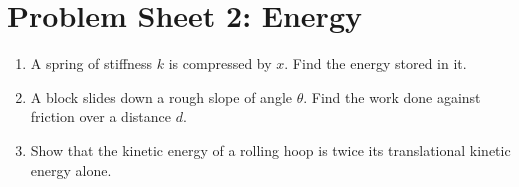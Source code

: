 \documentclass[12pt]{article}
\begin{document}
\section*{Problem Sheet 2: Energy}

\begin{enumerate}

\item A spring of stiffness $k$ is compressed by $x$. Find the energy stored
  in it.

\item A block slides down a rough slope of angle $\theta$. Find the work done
  against friction over a distance $d$.

\item Show that the kinetic energy of a rolling hoop is twice its
  translational kinetic energy alone.

\end{enumerate}
\end{document}

